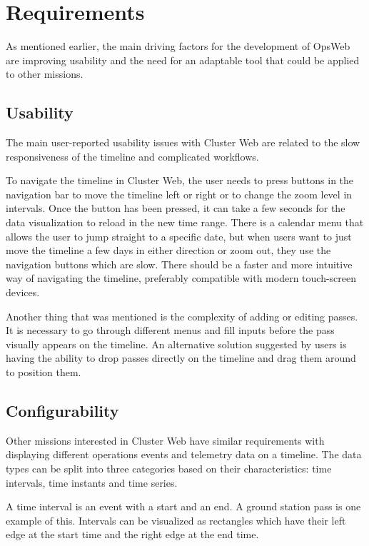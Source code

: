 \section{Requirements}
As mentioned earlier, the main driving factors for the development of OpsWeb are improving usability and the need for an adaptable tool that could be applied to other missions.
\subsection{Usability} \label{usability_req}
The main user-reported usability issues with Cluster Web are related to the slow responsiveness of the timeline and complicated workflows. 

To navigate the timeline in Cluster Web, the user needs to press buttons in the navigation bar to move the timeline left or right or to change the zoom level in intervals. Once the button has been pressed, it can take a few seconds for the data visualization to reload in the new time range. There is a calendar menu that allows the user to jump straight to a specific date, but when users want to just move the timeline a few days in either direction or zoom out, they use the navigation buttons which are slow. There should be a faster and more intuitive way of navigating the timeline, preferably compatible with modern touch-screen devices.

Another thing that was mentioned is the complexity of adding or editing passes. It is necessary to go through different menus and fill inputs before the pass visually appears on the timeline. An alternative solution suggested by users is having the ability to drop passes directly on the timeline and drag them around to position them.

\subsection{Configurability} \label{configurability_req}
Other missions interested in Cluster Web have similar requirements with displaying different operations events and telemetry data on a timeline. The data types can be split into three categories based on their characteristics: time intervals, time instants and time series.

A time interval is an event with a start and an end. A ground station pass is one example of this. Intervals can be visualized as rectangles which have their left edge at the start time and the right edge at the end time.

